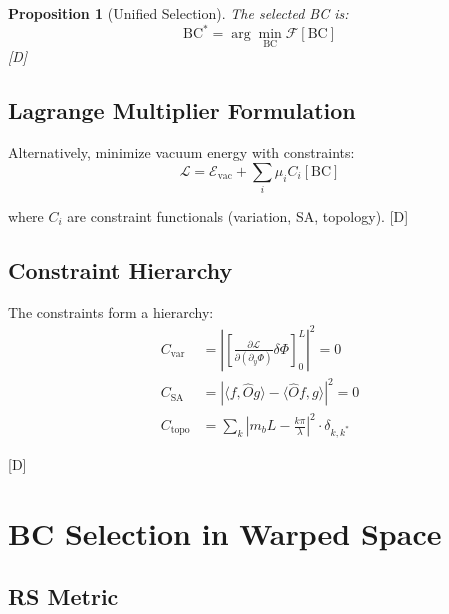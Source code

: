 \documentclass[11pt,a4paper]{article}
\newtheorem{proposition}[theorem]{Proposition}
\newcommand{\tagD}{\textcolor{blue!70!black}{[D]}}
\begin{document}
\begin{proposition}[Unified Selection]
\label{prop:unified}
The selected BC is:
\begin{equation}
\label{eq:unified-select}
\text{BC}^* = \arg\min_{\text{BC}} \mathcal{F}[\text{BC}]
\end{equation}
\tagD
\end{proposition}

\subsection{Lagrange Multiplier Formulation}

Alternatively, minimize vacuum energy with constraints:
\begin{equation}
\label{eq:lagrange}
\mathcal{L} = \mathcal{E}_{\text{vac}} + \sum_i \mu_i C_i[\text{BC}]
\end{equation}

where $C_i$ are constraint functionals (variation, SA, topology). \tagD

\subsection{Constraint Hierarchy}

The constraints form a hierarchy:
\begin{align}
\label{eq:constraint-var}
C_{\text{var}} &= \left|\left[ \frac{\partial\mathcal{L}}{\partial(\partial_y\Phi)} \delta\Phi \right]_0^L\right|^2 = 0 \\
\label{eq:constraint-sa}
C_{\text{SA}} &= \left|\langle f, \hat{O}g \rangle - \langle \hat{O}f, g \rangle\right|^2 = 0 \\
\label{eq:constraint-topo}
C_{\text{topo}} &= \sum_k \left|m_b L - \frac{k\pi}{\lambda}\right|^2 \cdot \delta_{k,k^*}
\end{align}

\tagD

\section{BC Selection in Warped Space}

\subsection{RS Metric}
\end{document}
